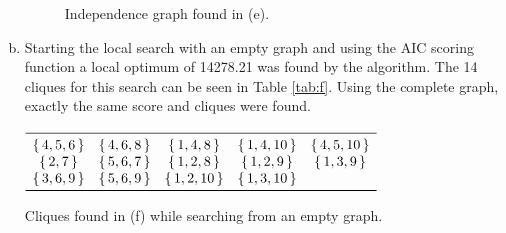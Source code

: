 \documentclass[a4paper,12pt]{scrartcl}
\begin{document}
\begin{enumerate}[(a)]
			\begin{figure}
				\centering
				
				\caption{Independence graph found in (e).}
		        \label{fig:e}
			\end{figure}
		\item Starting the local search with an empty graph and using the AIC scoring function a local optimum of 14278.21 was found by the algorithm. The 14 cliques for this search can be seen in Table \ref{tab:f}. Using the complete graph, exactly the same score and cliques were found.
		    \begin{table}[!htb]
			    \small  
		        \centering
		        $\begin{array}{ *{5}{c} }
		            \midrule
						\set{4,5,6} & \set{4,6,8} & \set{1,4,8} & \set{1,4,10} & \set{4,5,10} \\
						\set{2,7} & \set{5,6,7} & \set{1,2,8} & \set{1,2,9} & \set{1,3,9} \\
						 \set{3,6,9} & \set{5,6,9} & \set{1,2,10} & \set{1,3,10} \\ 
		            \bottomrule
		        \end{array}$
		        \caption{Cliques found in (f) while searching from an empty graph.}
		        \label{tab:f}
			\end{table}


\end{enumerate}
\end{document}
